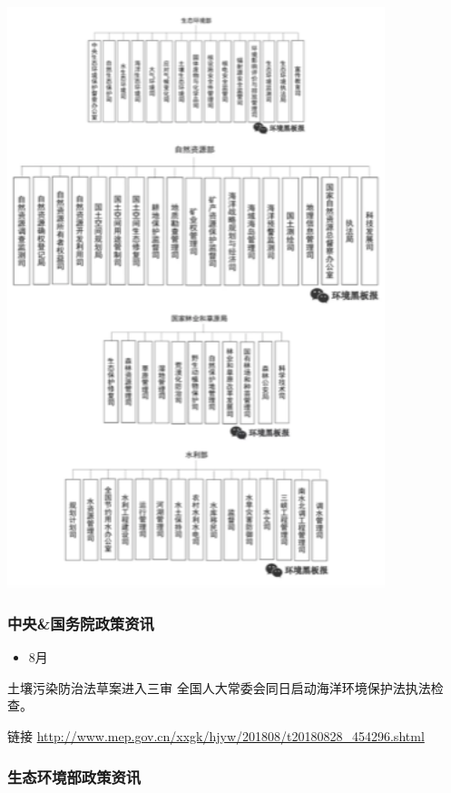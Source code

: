 \documentclass[
]{book}
\providecommand{\tightlist}{%
  \setlength{\itemsep}{0pt}\setlength{\parskip}{0pt}}
\begin{document}
\includegraphics[width=4.33in]{images/zc2}

\hypertarget{ux4e2dux592eux56fdux52a1ux9662ux653fux7b56ux8d44ux8baf-4}{%
\subsubsection*{中央\&国务院政策资讯}\label{ux4e2dux592eux56fdux52a1ux9662ux653fux7b56ux8d44ux8baf-4}}

\begin{itemize}
\tightlist
\item
  8月
\end{itemize}

土壤污染防治法草案进入三审 全国人大常委会同日启动海洋环境保护法执法检查。

链接 \url{http://www.mep.gov.cn/xxgk/hjyw/201808/t20180828_454296.shtml}

\hypertarget{ux751fux6001ux73afux5883ux90e8ux653fux7b56ux8d44ux8baf-4}{%
\subsubsection*{生态环境部政策资讯}\label{ux751fux6001ux73afux5883ux90e8ux653fux7b56ux8d44ux8baf-4}}
\end{document}
